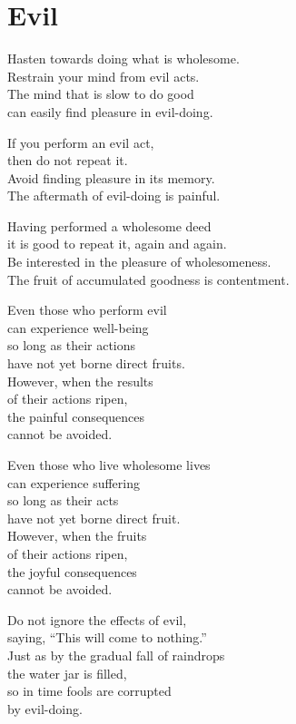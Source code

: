 
\chapter{Evil}


Hasten towards doing what is wholesome.\\
Restrain your mind from evil acts.\\
The mind that is slow to do good\\
can easily find pleasure in evil-doing.


If you perform an evil act,\\
then do not repeat it.\\
Avoid finding pleasure in its memory.\\
The aftermath of evil-doing is painful.


Having performed a wholesome deed\\
it is good to repeat it, again and again.\\
Be interested in the pleasure of wholesomeness.\\
The fruit of accumulated goodness is contentment.


Even those who perform evil\\
can experience well-being\\
so long as their actions\\
have not yet borne direct fruits.\\
However, when the results\\
of their actions ripen,\\
the painful consequences\\
cannot be avoided.


Even those who live wholesome lives\\
can experience suffering\\
so long as their acts\\
have not yet borne direct fruit.\\
However, when the fruits\\
of their actions ripen,\\
the joyful consequences\\
cannot be avoided.


Do not ignore the effects of evil,\\
saying, “This will come to nothing.”\\
Just as by the gradual fall of raindrops\\
the water jar is filled,\\
so in time fools are corrupted\\
by evil-doing.


